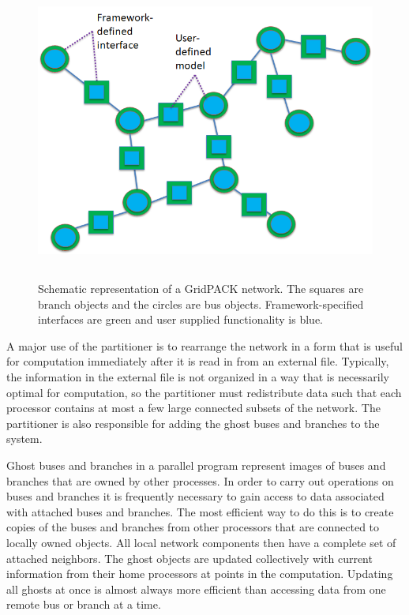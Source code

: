 \documentclass[12pt]{report} %
\begin{document}
\begin{figure}
  \centering
    \includegraphics*[width=5.52in, height=3.88in, keepaspectratio=true]{Fig3-Grid-network}
  \caption{Schematic representation of a GridPACK network. The squares are branch objects and the circles are bus objects. Framework-specified interfaces are green and user supplied functionality is blue.}
  \label{fig:fig-3}
\end{figure}


A major use of the partitioner is to rearrange the network in a form that is useful for computation immediately after it is read in from an external file. Typically, the information in the external file is not organized in a way that is necessarily optimal for computation, so the partitioner must redistribute data such that each processor contains at most a few large connected subsets of the network. The partitioner is also responsible for adding the ghost buses and branches to the system.

Ghost buses and branches in a parallel program represent images of buses and branches that are owned by other processes. In order to carry out operations on buses and branches it is frequently necessary to gain access to data associated with attached buses and branches. The most efficient way to do this is to create copies of the buses and branches from other processors that are connected to locally owned objects. All local network components then have a complete set of attached neighbors. The ghost objects are updated collectively with current information from their home processors at points in the computation. Updating all ghosts at once is almost always more efficient than accessing data from one remote bus or branch at a time.
\end{document}
